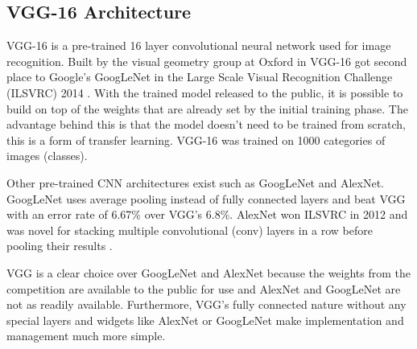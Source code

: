 \subsection{VGG-16 Architecture}

\newcommand{\anet}{AlexNet\xspace}
\newcommand{\gnet}{GoogLeNet\xspace}
\newcommand{\inet}{ImageNet\xspace}

VGG-16 is a pre-trained 16 layer convolutional neural network used for image recognition. Built by the visual geometry group at Oxford in \citeyear{vgg16-arxiv} VGG-16 got second place to Google's \gnet in the Large Scale Visual Recognition Challenge (ILSVRC) 2014 \cite{vgg16-arxiv}. With the trained model released to the public, it is possible to build on top of the weights that are already set by the initial training phase. The advantage behind this is that the model doesn't need to be trained from scratch, this is a form of transfer learning. VGG-16 was trained on 1000 categories of images (classes).

Other pre-trained CNN architectures exist such as \gnet and \anet. \gnet uses average pooling instead of fully connected layers \cite{googlenet-paper} and beat VGG with an error rate of 6.67\% over VGG's 6.8\%. \anet won ILSVRC in 2012 and was novel for stacking multiple convolutional (conv) layers in a row before pooling their results \cite{alexnet-paper}. %

VGG is a clear choice over \gnet and \anet because the weights from the competition are available to the public for use and \anet and \gnet are not as readily available. Furthermore, VGG's fully connected nature without any special layers and widgets like \anet or \gnet make implementation and management much more simple. %


